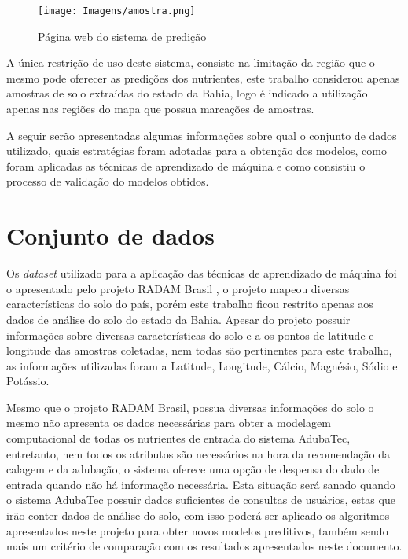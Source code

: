 \documentclass[
12pt,				%
oneside,			%
a4paper,			%
english,			%
french,				%
spanish,			%
brazil				%
]{abntex2}
\begin{document}
\begin{figure}[H]
	\caption{Página web do sistema de predição}
	\centering %
	\texttt{[image: Imagens/amostra.png]} %
	\label{figura:amostra}
\end{figure}

A única restrição de uso deste sistema, consiste na limitação da região que o mesmo pode oferecer as predições dos nutrientes, este trabalho considerou apenas amostras de solo extraídas do estado da Bahia, logo é indicado a utilização apenas nas regiões do mapa que possua marcações de amostras.

A seguir serão apresentadas algumas informações sobre qual o conjunto de dados utilizado, quais estratégias foram adotadas para a obtenção dos modelos, como foram aplicadas as técnicas de aprendizado de máquina e como consistiu o processo de validação do modelos obtidos.  

\section{Conjunto de dados}

Os \textit{dataset} utilizado para a aplicação das técnicas de aprendizado de máquina foi o apresentado pelo projeto RADAM Brasil  \cite{limaprojeto}, o projeto mapeou diversas características do solo do país, porém este trabalho ficou restrito apenas aos dados de análise do solo do estado da Bahia. Apesar do projeto possuir informações sobre diversas características do solo e a os pontos de latitude e longitude das amostras coletadas, nem todas são pertinentes para este trabalho, as informações utilizadas foram a Latitude, Longitude, Cálcio, Magnésio, Sódio e Potássio. 

Mesmo que o projeto RADAM Brasil, possua diversas informações do solo o mesmo não apresenta os dados necessárias para obter a modelagem computacional de todas os nutrientes de entrada do sistema AdubaTec, entretanto, nem todos os atributos são necessários na hora da recomendação da calagem e da adubação, o sistema oferece uma opção de despensa do dado de entrada quando não há informação necessária. Esta situação será sanado quando o sistema AdubaTec possuir dados suficientes de consultas de usuários, estas que irão conter dados de análise do solo, com isso poderá ser aplicado os algoritmos apresentados neste projeto para obter novos modelos preditivos, também sendo mais um critério de comparação com os resultados apresentados neste documento.
\end{document}

